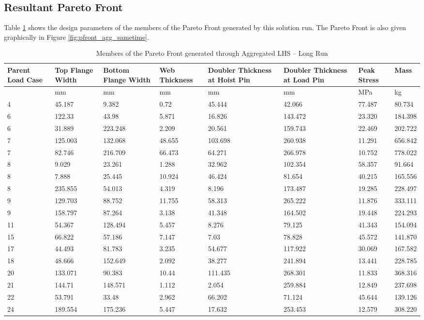 \subsection{Resultant Pareto Front}
Table \ref{tab:pfront_agg_sametime} shows the design parameters of the members of the Pareto Front generated by this solution run. The Pareto Front is also given graphically in Figure \ref{fig:pfront_agg_sametime}. 
\begin{table}[!htbp]
\small
\begin{tabular}{|p{1.5cm}p{1.5cm}p{1.5cm}p{1.4cm}p{2cm}p{2cm}p{1.5cm}p{1.5cm}|}
\hline
Parent Load Case&Top Flange Width&Bottom Flange Width&Web Thickness&Doubler Thickness at Hoist Pin&Doubler Thickness at Load Pin&Peak Stress& Mass\\
\hline
&mm&mm&mm&mm&mm&MPa&kg\\
\hline
4&45.187&9.382&0.72&45.444&42.066&77.487&80.734\\
6&122.33&43.98&5.871&16.826&143.472&23.320&184.398\\
6&31.889&223.248&2.209&20.561&159.743&22.469&202.722\\
7&125.003&132.068&48.655&103.698&260.938&11.291&656.842\\
7&82.746&216.709&66.473&64.271&266.978&10.752&778.022\\
8&9.029&23.261&1.288&32.962&102.354&58.357&91.664\\
8&7.888&25.445&10.924&46.424&81.654&40.215&165.556\\
8&235.855&54.013&4.319&8.196&173.487&19.285&228.497\\
9&129.703&88.752&11.755&58.313&265.222&11.876&333.111\\
9&158.797&87.264&3.138&41.348&164.502&19.448&224.293\\
11&54.367&128.494&5.457&8.276&79.125&41.343&154.094\\
15&66.822&57.186&7.147&7.03&78.828&45.572&141.870\\
17&44.493&81.783&3.235&54.677&117.922&30.069&167.582\\
18&48.666&152.649&2.092&38.277&241.894&13.441&228.785\\
20&133.071&90.383&10.44&111.435&268.301&11.833&368.316\\
21&144.71&148.571&1.112&2.054&259.884&12.849&237.698\\
22&53.791&33.48&2.962&66.202&71.124&45.644&139.126\\
24&189.554&175.236&5.447&17.632&253.453&12.579&308.220\\
\hline
\end{tabular}
\caption{Members of the Pareto Front generated through Aggregated LHS -- Long Run}
\label{tab:pfront_agg_sametime}
\end{table}


